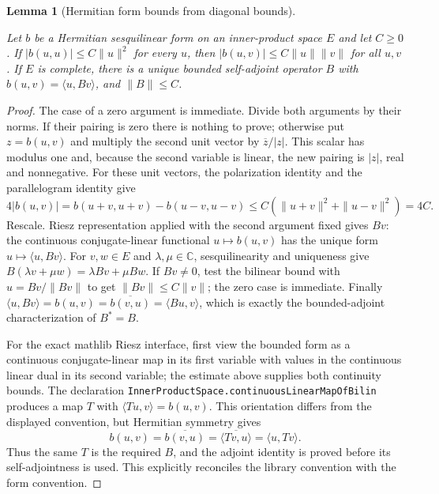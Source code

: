 \documentclass[11pt,a4paper]{article}
\newtheorem{lemma}[theorem]{Lemma}
\theoremstyle{definition}
\theoremstyle{remark}
\newcommand{\proofid}[1]{\par\smallskip{\normalfont\scriptsize\color{inkblue}Stable ID: \nolinkurl{#1}}\par\smallskip}
\begin{document}
\begin{lemma}[Hermitian form bounds from diagonal bounds]
\label{basic:polarization}
\proofid{basic:polarization}
\par{}\par\smallskip

Let $b$ be a Hermitian sesquilinear form on an inner-product space $E$ and let
$C\geq0$. If $|b(u,u)|\leq C\|u\|^2$ for every $u$, then
$|b(u,v)|\leq C\|u\|\|v\|$ for all $u,v$. If $E$ is complete, there is a
unique bounded self-adjoint operator $B$ with $b(u,v)=\langle u,Bv\rangle$,
and $\|B\|\leq C$.
\end{lemma}
\begin{proof}
The case of a zero argument is immediate. Divide both arguments by their
norms. If their pairing is zero there is nothing to prove; otherwise put
$z=b(u,v)$ and multiply the second unit vector by
$\overline z/|z|$. This scalar has modulus one and, because the second
variable is linear, the new pairing is $|z|$, real and nonnegative. For these unit vectors, the polarization identity and
the parallelogram identity give
\[
4|b(u,v)|=b(u+v,u+v)-b(u-v,u-v)
 \leq C(\|u+v\|^2+\|u-v\|^2)=4C.
\]
Rescale. Riesz representation applied with the second argument fixed gives
$Bv$: the continuous conjugate-linear functional $u\mapsto b(u,v)$ has
the unique form $u\mapsto\langle u,Bv\rangle$. For $v,w\in E$ and
$\lambda,\mu\in\mathbb C$, sesquilinearity and uniqueness give
$B(\lambda v+\mu w)=\lambda Bv+\mu Bw$. If $Bv\ne0$, test
the bilinear bound with $u=Bv/\|Bv\|$ to get
$\|Bv\|\leq C\|v\|$; the zero case is immediate.
Finally
$\langle u,Bv\rangle=b(u,v)=\overline{b(v,u)}=\langle Bu,v\rangle$,
which is exactly the bounded-adjoint characterization of $B^*=B$.

For the exact mathlib Riesz interface, first view the bounded form as a
continuous conjugate-linear map in its first variable with values in the
continuous linear dual in its second variable; the estimate above supplies
both continuity bounds. The declaration
\nolinkurl{InnerProductSpace.continuousLinearMapOfBilin} produces a map
$T$ with $\langle Tu,v\rangle=b(u,v)$. This orientation differs from
the displayed convention, but Hermitian symmetry gives
\[
 b(u,v)=\overline{b(v,u)}
       =\overline{\langle Tv,u\rangle}=\langle u,Tv\rangle.
\]
Thus the same $T$ is the required $B$, and the adjoint identity is proved
before its self-adjointness is used. This explicitly reconciles the
library convention with the form convention.
\end{proof}
\end{document}
